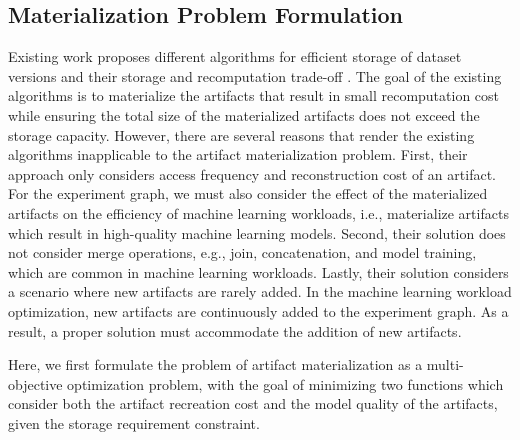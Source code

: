\subsection{Materialization Problem Formulation}\label{subsec-materialization-problem}
Existing work proposes different algorithms for efficient storage of dataset versions and their storage and recomputation trade-off \cite{bhattacherjee2015principles}.
The goal of the existing algorithms is to materialize the artifacts that result in small recomputation cost while ensuring the total size of the materialized artifacts does not exceed the storage capacity.
However, there are several reasons that render the existing algorithms inapplicable to the artifact materialization problem.
First, their approach only considers access frequency and reconstruction cost of an artifact.
For the experiment graph, we must also consider the effect of the materialized artifacts on the efficiency of machine learning workloads, i.e., materialize artifacts which result in high-quality machine learning models.
Second, their solution does not consider merge operations, e.g., join, concatenation, and model training, which are common in machine learning workloads.
Lastly, their solution considers a scenario where new artifacts are rarely added.
In the machine learning workload optimization, new artifacts are continuously added to the experiment graph.
As a result, a proper solution must accommodate the addition of new artifacts.

Here, we first formulate the problem of artifact materialization as a multi-objective optimization problem, with the goal of minimizing two functions which consider both the artifact recreation cost and the model quality of the artifacts, given the storage requirement constraint.


